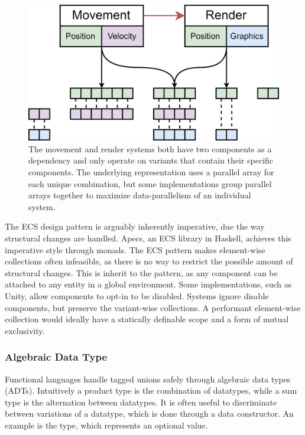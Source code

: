 \documentclass{article}
\newcommand{\type}[1]{\smash{\colorbox{codegray}{\texttt{#1}}}}
\begin{document}
\begin{figure}[ht]
    \centering
    \includegraphics[scale=0.10]{ECSexample.png}
    \caption
    { 
        The movement and render systems both have two components as a dependency and only operate on variants that contain their specific components.
        The underlying representation uses a parallel array for each unique combination, but some implementations group parallel arrays together to maximize data-parallelism of an individual system. 
    }
\end{figure}

The ECS design pattern is arguably inherently imperative, due the way structural changes are handled.
Apecs, an ECS library in Haskell, achieves this imperative style through monads\cite{ecs-apecs}.
The ECS pattern makes element-wise collections often infeasible, as there is no way to restrict the possible amount of structural changes.
This is inherit to the pattern, as any component can be attached to any entity in a global environment.
Some implementations, such as Unity\cite{unity-ecs-patent}, allow components to opt-in to be disabled.
Systems ignore disable components, but preserve the variant-wise collections.  
A performant element-wise collection would ideally have a statically definable scope and a form of mutual exclusivity.

\newpage

\subsubsection{Algebraic Data Type}

Functional languages handle tagged unions safely through algebraic data types (ADTs).
Intuitively a product type is the combination of datatypes, while a sum type is the alternation between datatypes.
It is often useful to discriminate between variations of a datatype, which is done through a data constructor.
An example is the \type{Maybe a} type, which represents an optional value. 
\end{document}
